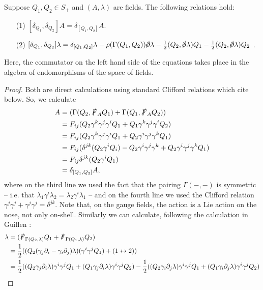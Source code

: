 \documentclass[10pt, oneside]{article}
\begin{document}
\begin{rmk}
\begin{lemma}
Suppose $Q_1, Q_2 \in S_+$ and $(A, \lambda)$ are fields.
The following relations hold:
\begin{itemize}
\item[(1)] \label{10dsusyA} $ [\delta_{Q_1}, \delta_{Q_2}] A = \delta_{[Q_1, Q_2]} A$.
\item[(2)] \label{10dsusyL} $ [\delta_{Q_1}, \delta_{Q_2}] \lambda = \delta_{[Q_1,Q_2]} \lambda - \rho(\Gamma(Q_1,Q_2)) \sd \dd \lambda - \frac 12(Q_2, \sd \dd \lambda)Q_1 - \frac 12(Q_2, \sd \dd \lambda)Q_2$ .
\end{itemize}
Here, the commutator on the left hand side of the equations takes place in the algebra of endomorphisms of the space of fields.
\end{lemma}
\begin{proof}
Both are direct calculations using standard Clifford relations which cite below.
So, we calculate
\begin{align*}
[\delta_{Q_1}, \delta_{Q_2}] A &= (\Gamma(Q_2,\sd F_A Q_1) + \Gamma(Q_1,\sd F_A Q_2)) \\
&=  F_{ij}(Q_2 \gamma^k \gamma^j \gamma^i Q_1 + Q_1 \gamma^k \gamma^j \gamma^i Q_2) \\
&=  F_{ij}(Q_2 \gamma^k \gamma^j \gamma^i Q_1 + Q_2 \gamma^i \gamma^j \gamma^k Q_1)\\
&= F_{ij}(\delta^{jk}(Q_2\gamma^i Q_i) - Q_2 \gamma^i \gamma^j \gamma^k + Q_2 \gamma^i \gamma^j \gamma^k Q_1)\\
&=  F_{ij}\delta^{jk}(Q_2 \gamma^i Q_1) \\
&= \delta_{[Q_1, Q_2]} A,
\end{align*}
where on the third line we used the fact that the pairing $\Gamma(-,-)$ is symmetric -- i.e. that $\lambda_1 \gamma^i \lambda_2 = \lambda_2 \gamma^i \lambda_1$ -- and on the fourth line we used the Clifford relation $\gamma^j\gamma^j+\gamma^j\gamma^j = \delta^{jk}$.  Note that, on the gauge fields, the action is a Lie action on the nose, not only on-shell.  Similarly we can calculate, following the calculation in Guillen \cite{Guillen}:
\begin{align*}
[\delta_{Q_1}, \delta_{Q_2}] \lambda &= (\sd F_{\Gamma(Q_2, \lambda)} Q_1 + \sd F_{\Gamma(Q_1,\lambda)} Q_2) \\
&= \frac 12((Q_2 (\gamma_j \dd_i - \gamma_i \dd_j) \lambda) (\gamma^i \gamma^j Q_1) + (1 \leftrightarrow 2)) \\
&= \frac 12((Q_2 \gamma_j \dd_i \lambda) \gamma^i \gamma^j Q_1 + (Q_1 \gamma_j \dd_i \lambda) \gamma^i \gamma^j Q_2) - \frac 12((Q_2 \gamma_i \dd_j \lambda) \gamma^i \gamma^j Q_1 + (Q_1 \gamma_i \dd_j \lambda) \gamma^i \gamma^j Q_2) \\

\end{align*}
\end{proof}
\end{rmk}
\end{document}
